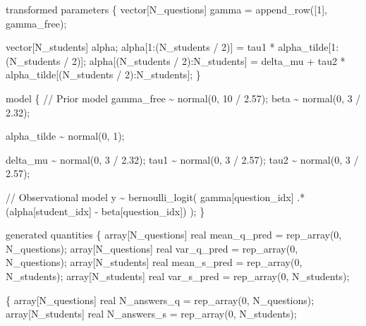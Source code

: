 \documentclass[
  letterpaper,
  DIV=11,
  numbers=noendperiod]{scrartcl}
\newenvironment{Shaded}{\begin{snugshade}}{\end{snugshade}}
\newcommand{\CommentTok}[1]{\textcolor[rgb]{0.37,0.37,0.37}{#1}}
\newcommand{\DataTypeTok}[1]{\textcolor[rgb]{0.68,0.00,0.00}{#1}}
\newcommand{\DecValTok}[1]{\textcolor[rgb]{0.68,0.00,0.00}{#1}}
\newcommand{\FloatTok}[1]{\textcolor[rgb]{0.68,0.00,0.00}{#1}}
\newcommand{\KeywordTok}[1]{\textcolor[rgb]{0.00,0.23,0.31}{#1}}
\newcommand{\NormalTok}[1]{\textcolor[rgb]{0.00,0.23,0.31}{#1}}
\begin{document}
\begin{codelisting}
\begin{Shaded}
\begin{Highlighting}[]
\KeywordTok{transformed parameters}\NormalTok{ \{}
  \DataTypeTok{vector}\NormalTok{[N\_questions] gamma = append\_row([}\DecValTok{1}\NormalTok{]\textquotesingle{}, gamma\_free);}

  \DataTypeTok{vector}\NormalTok{[N\_students] alpha;}
\NormalTok{  alpha[}\DecValTok{1}\NormalTok{:(N\_students / }\DecValTok{2}\NormalTok{)]}
\NormalTok{    = tau1 * alpha\_tilde[}\DecValTok{1}\NormalTok{:(N\_students / }\DecValTok{2}\NormalTok{)];}
\NormalTok{  alpha[(N\_students / }\DecValTok{2}\NormalTok{):N\_students]}
\NormalTok{    = delta\_mu + tau2 * alpha\_tilde[(N\_students / }\DecValTok{2}\NormalTok{):N\_students];}
\NormalTok{\}}

\KeywordTok{model}\NormalTok{ \{}
  \CommentTok{// Prior model}
\NormalTok{  gamma\_free \textasciitilde{} normal(}\DecValTok{0}\NormalTok{, }\DecValTok{10}\NormalTok{ / }\FloatTok{2.57}\NormalTok{);}
\NormalTok{  beta \textasciitilde{} normal(}\DecValTok{0}\NormalTok{, }\DecValTok{3}\NormalTok{ / }\FloatTok{2.32}\NormalTok{);}

\NormalTok{  alpha\_tilde \textasciitilde{} normal(}\DecValTok{0}\NormalTok{, }\DecValTok{1}\NormalTok{);}

\NormalTok{  delta\_mu \textasciitilde{} normal(}\DecValTok{0}\NormalTok{, }\DecValTok{3}\NormalTok{ / }\FloatTok{2.32}\NormalTok{);}
\NormalTok{  tau1 \textasciitilde{} normal(}\DecValTok{0}\NormalTok{, }\DecValTok{3}\NormalTok{ / }\FloatTok{2.57}\NormalTok{);}
\NormalTok{  tau2 \textasciitilde{} normal(}\DecValTok{0}\NormalTok{, }\DecValTok{3}\NormalTok{ / }\FloatTok{2.57}\NormalTok{);}

  \CommentTok{// Observational model}
\NormalTok{  y \textasciitilde{} bernoulli\_logit(   gamma[question\_idx]}
\NormalTok{                      .* (alpha[student\_idx] {-} beta[question\_idx]) );}
\NormalTok{\}}

\KeywordTok{generated quantities}\NormalTok{ \{}
  \DataTypeTok{array}\NormalTok{[N\_questions] }\DataTypeTok{real}\NormalTok{ mean\_q\_pred = rep\_array(}\DecValTok{0}\NormalTok{, N\_questions);}
  \DataTypeTok{array}\NormalTok{[N\_questions] }\DataTypeTok{real}\NormalTok{ var\_q\_pred  = rep\_array(}\DecValTok{0}\NormalTok{, N\_questions);}
  \DataTypeTok{array}\NormalTok{[N\_students]  }\DataTypeTok{real}\NormalTok{ mean\_s\_pred = rep\_array(}\DecValTok{0}\NormalTok{, N\_students);}
  \DataTypeTok{array}\NormalTok{[N\_students]  }\DataTypeTok{real}\NormalTok{ var\_s\_pred  = rep\_array(}\DecValTok{0}\NormalTok{, N\_students);}

\NormalTok{  \{}
    \DataTypeTok{array}\NormalTok{[N\_questions] }\DataTypeTok{real}\NormalTok{ N\_answers\_q = rep\_array(}\DecValTok{0}\NormalTok{, N\_questions);}
    \DataTypeTok{array}\NormalTok{[N\_students]  }\DataTypeTok{real}\NormalTok{ N\_answers\_s = rep\_array(}\DecValTok{0}\NormalTok{, N\_students);}


\end{Highlighting}
\end{Shaded}
\end{codelisting}
\end{document}
